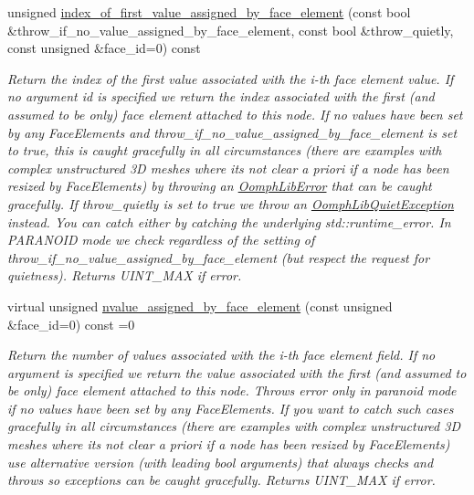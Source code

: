 \begin{DoxyCompactItemize}
unsigned \hyperlink{classoomph_1_1BoundaryNodeBase_a1ff36a9e6c0894657a3ea61f1a4beeae}{index\+\_\+of\+\_\+first\+\_\+value\+\_\+assigned\+\_\+by\+\_\+face\+\_\+element} (const bool \&throw\+\_\+if\+\_\+no\+\_\+value\+\_\+assigned\+\_\+by\+\_\+face\+\_\+element, const bool \&throw\+\_\+quietly, const unsigned \&face\+\_\+id=0) const
\begin{DoxyCompactList}\small\item\em Return the index of the first value associated with the i-\/th face element value. If no argument id is specified we return the index associated with the first (and assumed to be only) face element attached to this node. If no values have been set by any Face\+Elements and throw\+\_\+if\+\_\+no\+\_\+value\+\_\+assigned\+\_\+by\+\_\+face\+\_\+element is set to true, this is caught gracefully in all circumstances (there are examples with complex unstructured 3D meshes where it\textquotesingle{}s not clear a priori if a node has been resized by Face\+Elements) by throwing an \hyperlink{classoomph_1_1OomphLibError}{Oomph\+Lib\+Error} that can be caught gracefully. If throw\+\_\+quietly is set to true we throw an \hyperlink{classoomph_1_1OomphLibQuietException}{Oomph\+Lib\+Quiet\+Exception} instead. You can catch either by catching the underlying std\+::runtime\+\_\+error. In P\+A\+R\+A\+N\+O\+ID mode we check regardless of the setting of throw\+\_\+if\+\_\+no\+\_\+value\+\_\+assigned\+\_\+by\+\_\+face\+\_\+element (but respect the request for quietness). Returns U\+I\+N\+T\+\_\+\+M\+AX if error. \end{DoxyCompactList}\item 
virtual unsigned \hyperlink{classoomph_1_1BoundaryNodeBase_ae0d9f15e311861a09073ee01e5fb5cd2}{nvalue\+\_\+assigned\+\_\+by\+\_\+face\+\_\+element} (const unsigned \&face\+\_\+id=0) const =0
\begin{DoxyCompactList}\small\item\em Return the number of values associated with the i-\/th face element field. If no argument is specified we return the value associated with the first (and assumed to be only) face element attached to this node. Throws error only in paranoid mode if no values have been set by any Face\+Elements. If you want to catch such cases gracefully in all circumstances (there are examples with complex unstructured 3D meshes where it\textquotesingle{}s not clear a priori if a node has been resized by Face\+Elements) use alternative version (with leading bool arguments) that always checks and throws so exceptions can be caught gracefully. Returns U\+I\+N\+T\+\_\+\+M\+AX if error. \end{DoxyCompactList}\item 

\end{DoxyCompactItemize}

